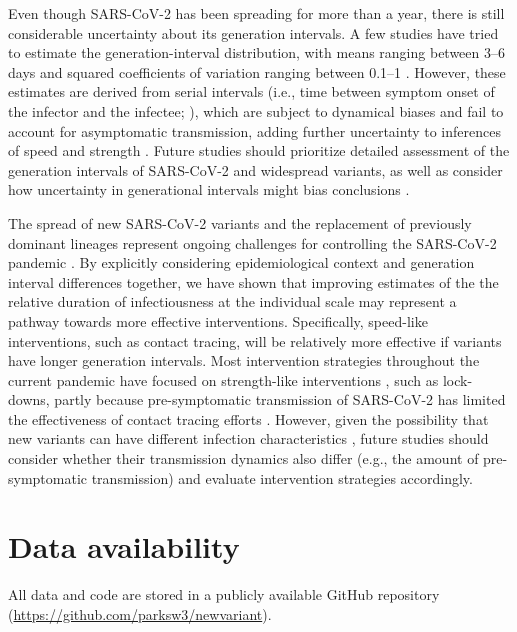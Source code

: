 \documentclass[12pt]{article}
\begin{document}
Even though SARS-CoV-2 has been spreading for more than a year, there is still considerable uncertainty about its generation intervals.
A few studies have tried to estimate the generation-interval distribution, with means ranging between 3--6 days and squared coefficients of variation ranging between 0.1--1 \citep{ferretti2020quantifying,Ferretti2020timing,ganyani2020estimating,knight2020estimating}.
However, these estimates are derived from serial intervals (i.e., time between symptom onset of the infector and the infectee; \cite{svensson2007note}), which are subject to dynamical biases \citep{park2021forward} and fail to account for asymptomatic transmission, adding further uncertainty to inferences of speed and strength \citep{park2020time}.
Future studies should prioritize detailed assessment of the generation intervals of SARS-CoV-2 and widespread variants, as well as consider how uncertainty in generational intervals might bias conclusions \citep{doi:10.1098/rsif.2020.0144,ali2020serial,gostic2020practical}.

The spread of new SARS-CoV-2 variants and the replacement of previously dominant lineages represent ongoing challenges for controlling the SARS-CoV-2 pandemic \citep{abdool2021new,fontanet2021sars,walensky2021sars}.  
By explicitly considering epidemiological context and generation interval differences together, we have shown that improving estimates of the the relative duration of infectiousness at the individual scale may represent a pathway towards more effective interventions. 
Specifically, speed-like interventions, such as contact tracing, will be relatively more effective if variants have longer generation intervals.
Most intervention strategies throughout the current pandemic have focused on strength-like interventions \citep{flaxman2020Rt}, such as lock-downs, partly because pre-symptomatic transmission of SARS-CoV-2 has limited the effectiveness of contact tracing efforts \citep{hellewell2020feasibility}.
However, given the possibility that new variants can have different infection characteristics \citep{kissler2021densely}, future studies should consider whether their transmission dynamics also differ (e.g., the amount of pre-symptomatic transmission) and evaluate intervention strategies accordingly.

\section*{Data availability}

All data and code are stored in a publicly available GitHub repository (\url{https://github.com/parksw3/newvariant}).
\end{document}
